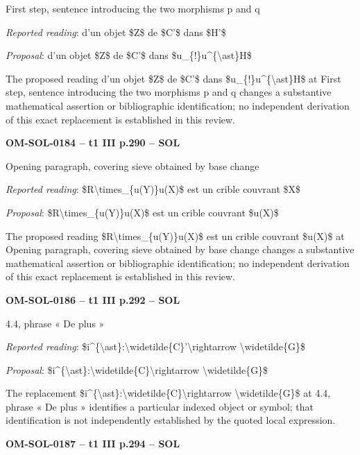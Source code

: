 First step, sentence introducing the two morphisms p and q\par
\emph{Reported reading}: d'un objet \$Z\$ de \$C'\$ dans \$H'\$\par
\emph{Proposal}: d'un objet \$Z\$ de \$C'\$ dans \$u\_\{!\}u\textasciicircum{}\{\textbackslash{}ast\}H\$\par
The proposed reading d'un objet \$Z\$ de \$C'\$ dans \$u\_\{!\}u\textasciicircum{}\{\textbackslash{}ast\}H\$ at First step, sentence introducing the two morphisms p and q changes a substantive mathematical assertion or bibliographic identification; no independent derivation of this exact replacement is established in this review.\par
\par\noindent\textbf{OM-SOL-0184 -- t1 III p.290 -- SOL}\par
Opening paragraph, covering sieve obtained by base change\par
\emph{Reported reading}: \$R\textbackslash{}times\_\{u(Y)\}u(X)\$ est un crible couvrant \$X\$\par
\emph{Proposal}: \$R\textbackslash{}times\_\{u(Y)\}u(X)\$ est un crible couvrant \$u(X)\$\par
The proposed reading \$R\textbackslash{}times\_\{u(Y)\}u(X)\$ est un crible couvrant \$u(X)\$ at Opening paragraph, covering sieve obtained by base change changes a substantive mathematical assertion or bibliographic identification; no independent derivation of this exact replacement is established in this review.\par
\par\noindent\textbf{OM-SOL-0186 -- t1 III p.292 -- SOL}\par
4.4, phrase « De plus »\par
\emph{Reported reading}: \$i\textasciicircum{}\{\textbackslash{}ast\}:\textbackslash{}widetilde\{C\}'\textbackslash{}rightarrow \textbackslash{}widetilde\{G\}\$\par
\emph{Proposal}: \$i\textasciicircum{}\{\textbackslash{}ast\}:\textbackslash{}widetilde\{C\}\textbackslash{}rightarrow \textbackslash{}widetilde\{G\}\$\par
The replacement \$i\textasciicircum{}\{\textbackslash{}ast\}:\textbackslash{}widetilde\{C\}\textbackslash{}rightarrow \textbackslash{}widetilde\{G\}\$ at 4.4, phrase « De plus » identifies a particular indexed object or symbol; that identification is not independently established by the quoted local expression.\par
\par\noindent\textbf{OM-SOL-0187 -- t1 III p.294 -- SOL}\par
